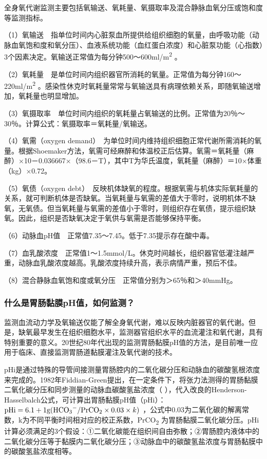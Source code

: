 全身氧代谢监测主要包括氧输送、氧耗量、氧摄取率及混合静脉血氧分压或饱和度等监测指标。

（1）氧输送　指单位时间内心脏泵血所提供给组织细胞的氧量，由呼吸功能（动脉血氧饱和度和氧分压）、血液系统功能（血红蛋白浓度）和心脏泵功能（心指数）3个因素决定。氧输送正常值为每分钟500～600ml/m\textsuperscript{2}
。

（2）氧耗量　是单位时间内组织器官所消耗的氧量。正常值为每分钟160～220ml/m\textsuperscript{2}
。感染性休克时氧耗量常常与氧输送具有病理依赖关系，即随氧输送增加，氧耗量也明显增加。

（3）氧摄取率　单位时间内组织的氧耗量占氧输送的比例。正常值为20％～30％。计算公式：氧摄取率＝氧耗量/氧输送。

（4）氧需（oxygen
demand）　为单位时间内维持组织细胞正常代谢所需消耗的氧量。根据Shoemaker方法，氧需可经麻醉和体温校正后估算。氧需＝氧耗量（麻醉）×10－0.036667×（98.6－T），其中T为华氏温度，氧耗量（麻醉）＝10×体重（kg）×0.72。

（5）氧债（oxygen
debt）　反映机体缺氧的程度。根据氧需与机体实际氧耗量的关系，就可判断机体是否缺氧。当氧耗量与氧需的差值大于零时，说明机体不缺氧，无氧债。但当氧耗量与氧需的差值小于零时，则组织存在氧债，提示组织缺氧。因此，组织是否缺氧决定于氧供与氧需是否能够保持平衡。

（6）动脉血pH值　正常值7.35～7.45。低于7.35提示存在酸中毒。

（7）血乳酸浓度　正常值1～1.5mmol/L。休克时间越长，组织器官低灌注越严重，动脉血乳酸浓度越高。乳酸浓度持续升高，表示病情严重，预后不佳。

（8）混合静脉血氧饱和度或氧分压　正常值分别为＞65％和＞40mmHg。

\subsubsection{什么是胃肠黏膜pH值，如何监测？}

监测血流动力学及氧输送仅能了解全身氧代谢，难以反映内脏器官的氧代谢。但是，缺氧最早发生在组织细胞水平，监测器官组织水平的血流灌注和氧代谢，具有特别重要的意义。20世纪80年代出现的监测胃肠黏膜pH值的方法，是目前唯一应用于临床、直接监测胃肠道黏膜灌注及氧代谢的技术。

pHi是通过特殊的导管间接测量胃肠腔内的二氧化碳分压和动脉血的碳酸氢根浓度来完成的。1982年Fiddian-Green提出，在一定条件下，将张力法测得的胃肠黏膜二氧化碳分压和同步测量的动脉血碳酸氢盐浓度（
），代入改良的Henderson-Hasselbalch公式，可计算出胃肠黏膜pH值（pHi）：$\text{pHi}=6.1+1\text{g} (\ce{HCO3-}/\text{PrCO}_2\times 0.03\times k)$
，公式中0.03为二氧化碳的解离常数，k为不同平衡时间相对应的校正系数，PrCO\textsubscript{2}
为胃肠黏膜二氧化碳分压。pHi计算必须满足的3个假设：①二氧化碳能在组织间自由弥散；②胃肠腔内液体中的二氧化碳分压等于黏膜内二氧化碳分压；③动脉血中的碳酸氢盐浓度与胃肠黏膜中的碳酸氢盐浓度相等。


